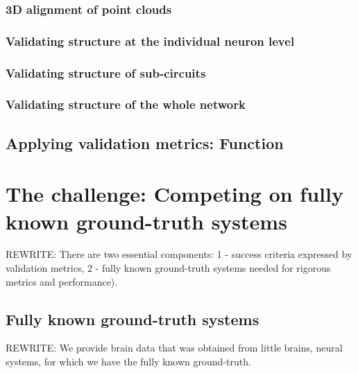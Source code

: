 \documentclass{ldr-article}
\begin{document}
\subsubsection{3D alignment of point clouds}

\subsubsection{Validating structure at the individual neuron level}

\subsubsection{Validating structure of sub-circuits}

\subsubsection{Validating structure of the whole network}

\subsection{Applying validation metrics: Function}




\section{The challenge: Competing on fully known ground-truth systems}

\alert{REWRITE:} There are two essential components: 1 - success criteria expressed by validation metrics, 2 - fully known ground-truth systems needed for rigorous metrics and performance).

\subsection{Fully known ground-truth systems}

\alert{REWRITE:} We provide brain data that was obtained from little brains, neural systems, for which we have the fully known ground-truth.
\end{document}
